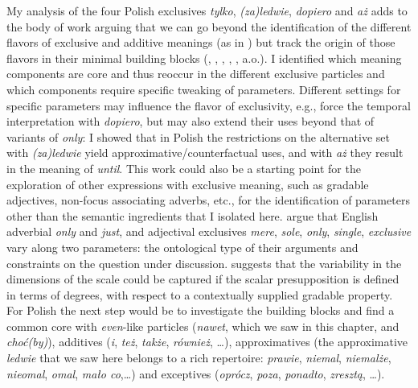 \documentclass[output=paper,colorlinks,citecolor=brown]{langscibook}
\begin{document}
My analysis of the four Polish exclusives \textit{tylko}, \textit{(za)ledwie}, \textit{dopiero} and \textit{aż} adds to the body of work arguing that we can go beyond the identification of the different flavors of exclusive and additive meanings (as in \citealt{koenig91}) but track the origin of those flavors in their minimal building blocks (\citealt{rullmann97}, \citealt{guerzoni03}, \citealt{lahiri10}, \citealt{crnic11}, \citealt{coppockbeaver11, coppockbeaver10, coppockbeaver14}, a.o.). I identified which meaning components are core and thus reoccur in the different exclusive particles and which components require specific tweaking of parameters. Different settings for specific parameters may influence the flavor of exclusivity, e.g., force the temporal interpretation with \textit{dopiero}, but may also extend their uses beyond that of variants of \textit{only}: I showed that in Polish the restrictions on the alternative set with \textit{(za)ledwie} yield approximative/counterfactual uses, and with \textit{aż} they result in the meaning of \textit{until}.  This work could also be a starting point for the exploration of other expressions with exclusive meaning, such as gradable adjectives, non-focus associating adverbs, etc., for the identification of parameters other than the semantic ingredients that I isolated here. \citet{coppockbeaver11,coppockbeaver10,coppockbeaver14} argue that English adverbial \textit{only} and \textit{just}, and adjectival exclusives \textit{mere}, \textit{sole}, \textit{only}, \textit{single}, \textit{exclusive} vary along two parameters: the ontological type of their arguments and constraints on the question under discussion. \citet{greenberg16,greenberg22} suggests that the variability in the dimensions of the scale could be captured if the scalar presupposition is defined in terms of degrees, with respect to a contextually supplied gradable property. For Polish the next step would be to investigate the building blocks and find a common core with \textit{even}-like particles (\textit{nawet}, which we saw in this chapter, and \textit{choć(by)}), additives (\textit{i}, \textit{też}, \textit{także}, \textit{również}, …), approximatives (the approximative \textit{ledwie} that we saw here belongs to a rich repertoire: \textit{prawie}, \textit{niemal}, \textit{niemalże}, \textit{nieomal}, \textit{omal}, \textit{mało co},…) and exceptives (\textit{oprócz}, \textit{poza}, \textit{ponadto}, \textit{zresztą}, …).
\end{document}
